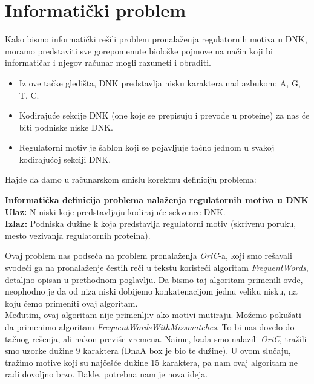 \section{Informatički problem}

Kako bismo informatički rešili problem pronalaženja regulatornih motiva u DNK, moramo predstaviti sve gorepomenute biološke pojmove na način koji bi informatičar i njegov računar mogli razumeti i obraditi. 

\begin{itemize}
    \item Iz ove tačke gledišta, DNK predstavlja nisku karaktera nad azbukom: {A, G, T, C}.
    \item Kodirajuće sekcije DNK (one koje se prepisuju i prevode u proteine) za nas će biti podniske niske DNK.
    \item Regulatorni motiv je šablon koji se pojavljuje tačno jednom u svakoj kodirajućoj sekciji DNK.
\end{itemize}

Hajde da damo u računarskom smislu korektnu definiciju problema: \\
\begin{tcolorbox}
\textbf{Informatička definicija problema nalaženja regulatornih motiva u DNK} \\
\textbf{Ulaz:} N niski koje predstavljaju kodirajuće sekvence DNK.\\
\textbf{Izlaz:} Podniska dužine k koja predstavlja regulatorni motiv (skrivenu poruku, mesto vezivanja regulatornih proteina).
\end{tcolorbox} 

Ovaj problem nas podseća na problem pronalaženja \textit{OriC}-a, koji smo rešavali svodeći ga na pronalaženje čestih reči u tekstu koristeći algoritam \textit{FrequentWords}, detaljno opisan u prethodnom poglavlju. Da bismo taj algoritam primenili ovde, neophodno je da od niza niski dobijemo konkatenacijom jednu veliku nisku, na koju ćemo primeniti ovaj algoritam. \\

Međutim, ovaj algoritam nije primenljiv ako motivi mutiraju. Možemo pokušati da primenimo algoritam \textit{FrequentWordsWithMissmatches}. To bi nas dovelo do tačnog rešenja, ali nakon previše vremena. Naime, kada smo nalazili \textit{OriC}, tražili smo uzorke dužine 9 karaktera (DnaA box je bio te dužine). U ovom slučaju, tražimo motive koji su najčešće dužine 15 karaktera, pa nam ovaj algoritam ne radi dovoljno brzo. Dakle, potrebna nam je nova ideja. 

